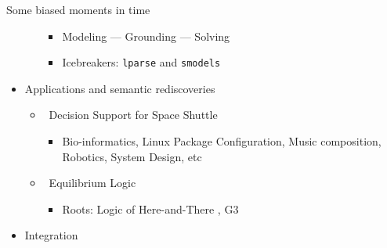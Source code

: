 \begin{frame}{Some biased moments in time}
\begin{itemize}
\begin{itemize}
      \begin{itemize}
      \item <only@9-9>Modeling --- Grounding --- Solving
      \item <only@9-9>Icebreakers: \texttt{lparse} and \texttt{smodels}
      \end{itemize}
    \end{itemize}
  \item<only@10-> Applications and semantic rediscoveries
    \begin{itemize}
    \item <only@11->  \ Decision Support for Space Shuttle
      \begin{itemize}
      \item <only@12>
        Bio-informatics,
        Linux Package Configuration,
        Music composition,
        Robotics,
        System Design,
        etc
      \end{itemize}
    \item <only@11->  \ Equilibrium Logic
      \begin{itemize}
      \item<only@13> Roots: Logic of Here-and-There \nocite{heyting30a}, G3 \nocite{goedel32a}
      \end{itemize}
    \end{itemize}
  \item<only@14-16> Integration
  \end{itemize}
\end{frame}
